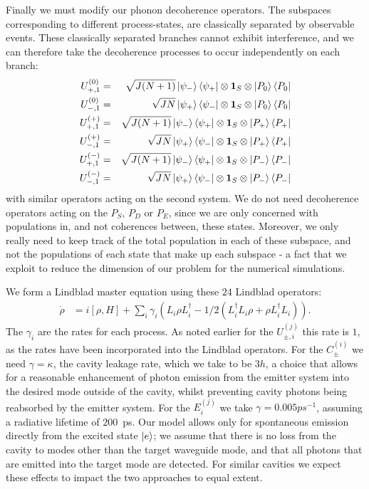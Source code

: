 Finally we must modify our phonon decoherence operators. The subspaces corresponding to different process-states, are classically separated by observable events. These classically separated branches cannot exhibit interference, and we can therefore take the decoherence processes to occur independently on each branch:
\begin{eqnarray}
  U_{+,1}^{(0)} &=& \sqrt{J(N+1)}\left\vert \psi_- \right\rangle \left\langle \psi_+ \right\vert \otimes \mathbf{1}_S \otimes \left\vert P_0 \right\rangle \left\langle P_0 \right\vert\\
  U_{-,1}^{(0)} &=& \sqrt{JN}\left\vert \psi_+ \right\rangle \left\langle \psi_- \right\vert \otimes \mathbf{1}_S \otimes \left\vert P_0 \right\rangle \left\langle P_0 \right\vert\\
  U_{+,1}^{(+)} &=& \sqrt{J(N+1)}\left\vert \psi_- \right\rangle \left\langle \psi_+ \right\vert \otimes \mathbf{1}_S \otimes \left\vert P_+ \right\rangle \left\langle P_+ \right\vert\\
  U_{-,1}^{(+)} &=& \sqrt{JN}\left\vert \psi_+ \right\rangle \left\langle \psi_- \right\vert \otimes \mathbf{1}_S \otimes \left\vert P_+ \right\rangle \left\langle P_+ \right\vert\\
  U_{+,1}^{(-)} &=& \sqrt{J(N+1)}\left\vert \psi_- \right\rangle \left\langle \psi_+ \right\vert \otimes \mathbf{1}_S \otimes \left\vert P_- \right\rangle \left\langle P_- \right\vert\\
  U_{-,1}^{(-)} &=& \sqrt{JN}\left\vert \psi_+ \right\rangle \left\langle \psi_- \right\vert \otimes \mathbf{1}_S \otimes \left\vert P_- \right\rangle \left\langle P_- \right\vert
\end{eqnarray}  
with similar operators acting on the second system. We do not need decoherence operators acting on the $P_S$, $P_D$ or $P_E$, since we are only concerned with populations in, and not coherences between, these states. Moreover, we only really need to keep track of the total population in each of these subspace, and not the populations of each state that make up each subspace - a fact that we exploit to reduce the dimension of our problem for the numerical simulations.

We form a Lindblad master equation using these $24$ Lindblad operators:
\begin{eqnarray}
  \dot{\rho} &= i\left[ \rho, H \right] + \sum_i \gamma_i \left( L_i\rho L_i^\dagger - 1/2(L_i^\dagger L_i\rho + \rho L_i^\dagger L_i) \right).
\end{eqnarray}
The $\gamma_i$ are the rates for each process. As noted earlier for the $U_{\pm, i}^{(j)}$ this rate is $1$, as the rates have been incorporated into the Lindblad operators. For the $C_\pm^{(i)}$ we need $\gamma = \kappa$, the cavity leakage rate, which we take to be $3h$, a choice that allows for a reasonable enhancement of photon emission from the emitter system into the desired mode outside of the cavity, whilst preventing cavity photons being reabsorbed by the emitter system. For the $E_i^{(j)}$ we take $\gamma = 0.005ps^{-1}$, assuming a radiative lifetime of $200$~ps. Our model allows only for spontaneous emission directly from the excited state $\left\vert e\right\rangle$; we assume that there is no loss from the cavity to modes other than the target waveguide mode, and that all photons that are emitted into the target mode are detected. For similar cavities we expect these effects to impact the two approaches to equal extent. 


